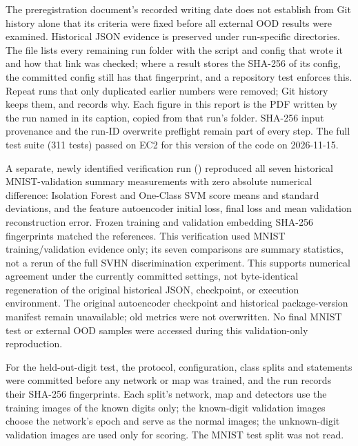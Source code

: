 \documentclass[11pt]{article}
\begin{document}
The preregistration document's recorded writing date does not establish from Git history alone that its criteria were fixed before all external OOD results were examined. Historical JSON evidence is preserved under run-specific directories. The file  lists every remaining run folder with the script and config that wrote it and how that link was checked; where a result stores the SHA-256 of its config, the committed config still has that fingerprint, and a repository test enforces this. Repeat runs that only duplicated earlier numbers were removed; Git history keeps them, and  records why. Each figure in this report is the PDF written by the run named in its caption, copied from that run's folder. SHA-256 input provenance and the run-ID overwrite preflight remain part of every step. The full test suite (311 tests) passed on EC2 for this version of the code on 2026-11-15.\par

A separate, newly identified verification run () reproduced all seven historical MNIST-validation summary measurements with zero absolute numerical difference: Isolation Forest and One-Class SVM score means and standard deviations, and the feature autoencoder initial loss, final loss and mean validation reconstruction error. Frozen training and validation embedding SHA-256 fingerprints matched the references. This verification used MNIST training/validation evidence only; its seven comparisons are summary statistics, not a rerun of the full SVHN discrimination experiment. This supports numerical agreement under the currently committed settings, not byte-identical regeneration of the original historical JSON, checkpoint, or execution environment. The original autoencoder checkpoint and historical package-version manifest remain unavailable; old metrics were not overwritten. No final MNIST test or external OOD samples were accessed during this validation-only reproduction.

For the held-out-digit test, the protocol, configuration, class splits and statements were committed before any network or map was trained, and the run records their SHA-256 fingerprints. Each split's network, map and detectors use the training images of the known digits only; the known-digit validation images choose the network's epoch and serve as the normal images; the unknown-digit validation images are used only for scoring. The MNIST test split was not read.
\end{document}
